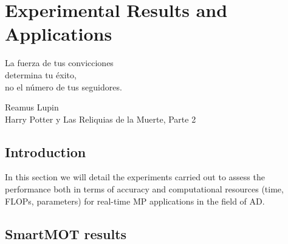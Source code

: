 % 
% 
% 
% 
% 
% 
% 

\chapter{Experimental Results and Applications}
\label{cha:experimental_results_and_applications}

\begin{FraseCelebre}
	\begin{Frase}
		La fuerza de tus convicciones \\
		determina tu éxito, \\
		no el número de tus seguidores.
	\end{Frase}
	\begin{Fuente}
		Reamus Lupin \\
		Harry Potter y Las Reliquias de la Muerte, Parte 2
	\end{Fuente}
\end{FraseCelebre}

\section{Introduction}
\label{sec:5_introduction}

In this section we will detail the experiments carried out to assess the performance both in terms of accuracy and computational resources (time, \acp{FLOP}, parameters) for real-time \ac{MP} applications in the field of \ac{AD}.

\section{SmartMOT results}
\label{sec:5_mot_and_euroncap}


